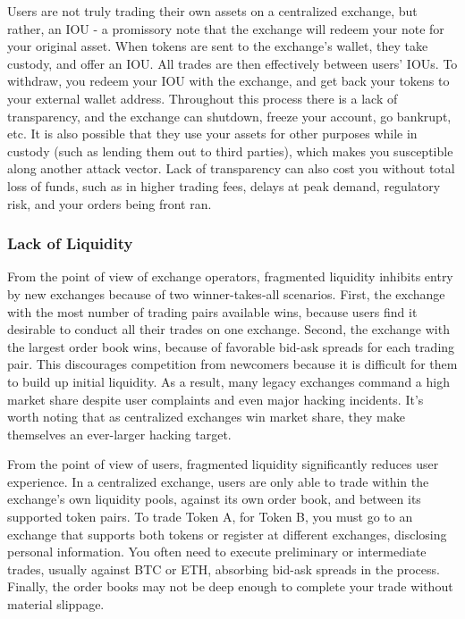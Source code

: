 \documentclass[UTF8,nofonts]{article}
\begin{document}
Users are not truly trading their own assets on a centralized exchange, but rather, an IOU - a promissory note that the exchange will redeem your note for your original asset. When tokens are sent to the exchange's wallet, they take custody, and offer an IOU. All trades are then effectively between users' IOUs. To withdraw, you redeem your IOU with the exchange, and get back your tokens to your external wallet address. Throughout this process there is a lack of transparency, and the exchange can shutdown, freeze your account, go bankrupt, etc. It is also possible that they use your assets for other purposes while in custody (such as lending them out to third parties), which makes you susceptible along another attack vector. Lack of transparency can also cost you without total loss of funds, such as in higher trading fees, delays at peak demand, regulatory risk, and your orders being front ran.

\subsubsection{Lack of Liquidity}
From the point of view of exchange operators, fragmented liquidity inhibits entry by new exchanges because of two winner-takes-all scenarios. First, the exchange with the most number of trading pairs available wins, because users find it desirable to conduct all their trades on one exchange. Second, the exchange with the largest order book wins, because of favorable bid-ask spreads for each trading pair. This discourages competition from newcomers because it is difficult for them to build up initial liquidity. As a result, many legacy exchanges command a high market share despite user complaints and even major hacking incidents. It's worth noting that as centralized exchanges win market share, they make themselves an ever-larger hacking target. 

From the point of view of users, fragmented liquidity significantly reduces user experience. In a centralized exchange, users are only able to trade within the exchange's own liquidity pools, against its own order book, and between its supported token pairs. To trade Token A, for Token B, you must go to an exchange that supports both tokens or register at different exchanges, disclosing personal information. You often need to execute preliminary or intermediate trades, usually against BTC or ETH, absorbing bid-ask spreads in the process. Finally, the order books may not be deep enough to complete your trade without material slippage.
\end{document}
